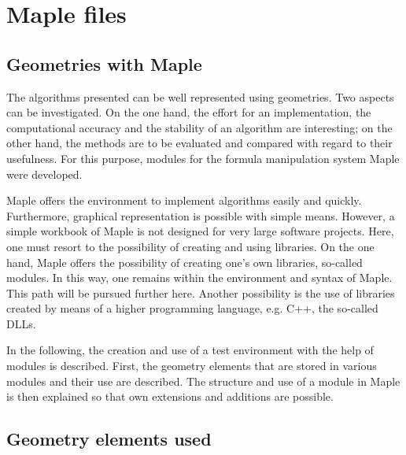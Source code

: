 %
%



\chapter{Maple files}

\cite{Wat:2017a,Wat:2017b,Wat:2017c,Wat:2017d,Wat:2017e,Wat:2017f}

\section{Geometries with Maple}

The algorithms presented can be well represented using geometries. Two aspects can be investigated. On the one hand, the effort for an implementation, the computational accuracy and the stability of an algorithm are interesting; on the other hand, the methods are to be evaluated and compared with regard to their usefulness. For this purpose, modules for the formula manipulation system Maple \cite{Wat:2017a} were developed. 

Maple offers the environment to implement algorithms easily and quickly. Furthermore, graphical representation is possible with simple means. However, a simple workbook 
of Maple is not designed for very large software projects. Here, one must resort to the possibility of creating and using libraries. On the one hand, Maple offers the possibility of creating one's own libraries, so-called modules. In this way, one remains within the environment and syntax of Maple. This path will be pursued further here. Another possibility is the use of libraries created by means of a higher programming language, e.g. C++, the so-called DLLs.

In the following, the creation and use of a test environment with the help of modules is described. First, the geometry elements that are stored in various modules and their use are described. The structure and use of a module in Maple is then explained so that own extensions and additions are possible.



\section{Geometry elements used}

